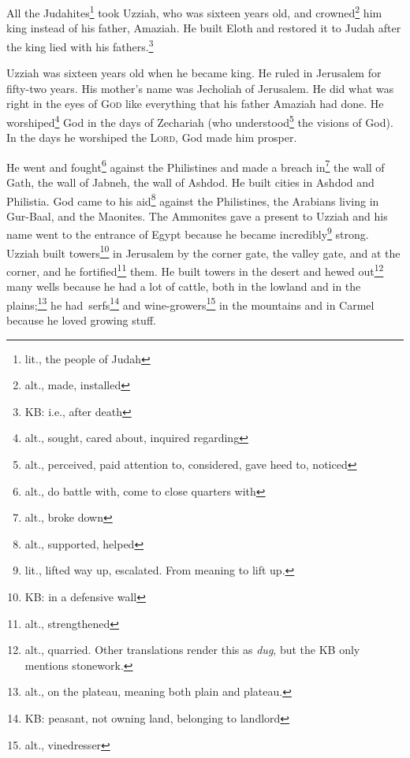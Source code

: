 
\begin{inparaenum}
     All the Judahites\footnote{lit., the people of Judah} took Uzziah, who was sixteen years old, and crowned\footnote{alt., made, installed} him king instead of his father, Amaziah.%
     He built Eloth and restored it to Judah after the king lied with his fathers.\footnote{KB: i.e., after death}%
    
     Uzziah was sixteen years old when he became king. He ruled in Jerusalem for fifty-two years. His mother's name was Jecholiah of Jerusalem.%
     He did what was right in the eyes of \textsc{God} like everything that his father Amaziah had done.%
     He worshiped\footnote{alt., sought, cared about, inquired regarding} God in the days of Zechariah (who understood\footnote{alt., perceived, paid attention to, considered, gave heed to, noticed} the visions of God). In the days he worshiped the \textsc{Lord}, God made him prosper.%
    
     He went and fought\footnote{alt., do battle with, come to close quarters with} against the Philistines and made a breach in\footnote{alt., broke down} the wall of Gath, the wall of Jabneh, the wall of Ashdod. He built cities in Ashdod and Philistia.%
     God came to his aid\footnote{alt., supported, helped} against the Philistines, the Arabians living in Gur-Baal, and the Maonites.%
     The Ammonites gave a present to Uzziah and his name went to the entrance of Egypt because he became incredibly\footnote{lit., lifted way up, escalated. From  meaning to lift up.} strong.%
     Uzziah built towers\footnote{KB: in a defensive wall} in Jerusalem by the corner gate, the valley gate, and at the corner, and he fortified\footnote{alt., strengthened} them.%
     He built towers in the desert and hewed out\footnote{alt., quarried. Other translations render this as \textit{dug}, but the KB only mentions stonework.} many wells because he had a lot of cattle, both in the lowland and in the plains;\footnote{alt., on the plateau,  meaning both plain and plateau.} he had\understood\ serfs\footnote{KB: peasant, not owning land, belonging to landlord} and wine-growers\footnote{alt., vinedresser} in the mountains and in Carmel because he loved growing stuff.%
    

\end{inparaenum}
